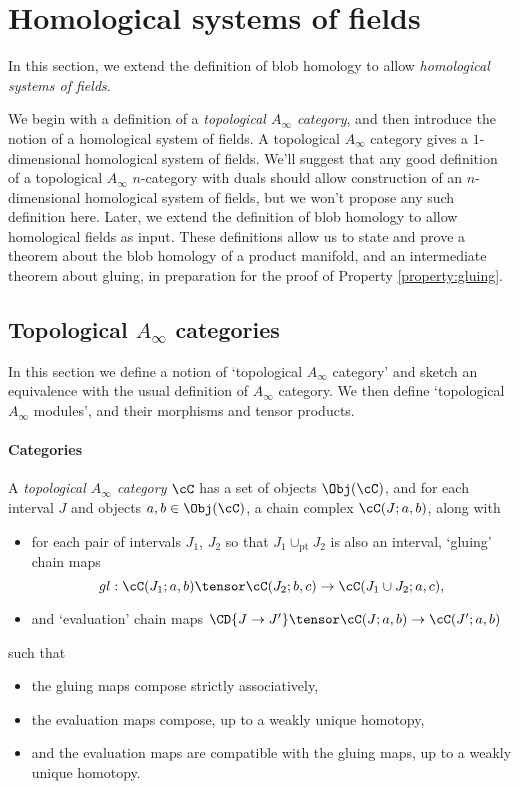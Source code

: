 
\section{Homological systems of fields}
\label{sec:homological-fields}

In this section, we extend the definition of blob homology to allow \emph{homological systems of fields}.

We begin with a definition of a \emph{topological $A_\infty$ category}, and then introduce the notion of a homological system of fields. A topological $A_\infty$ category gives a $1$-dimensional homological system of fields. We'll suggest that any good definition of a topological $A_\infty$ $n$-category with duals should allow construction of an $n$-dimensional homological system of fields, but we won't propose any such definition here. Later, we extend the definition of blob homology to allow homological fields as input. These definitions allow us to state and prove a theorem about the blob homology of a product manifold, and an intermediate theorem about gluing, in preparation for the proof of Property \ref{property:gluing}.

\subsection{Topological $A_\infty$ categories}
In this section we define a notion of `topological $A_\infty$ category' and sketch an equivalence with the usual definition of $A_\infty$ category. We then define `topological $A_\infty$ modules', and their morphisms and tensor products.

\paragraph{Categories}
\begin{defn}
\label{defn:topological-Ainfty-category}%
A \emph{topological $A_\infty$ category} $\cC$ has a set of objects $\Obj(\cC)$, and for each interval $J$ and objects $a,b \in \Obj(\cC)$, a chain complex $\cC(J;a,b)$, along with
\begin{itemize}
\item for each pair of intervals $J_1$, $J_2$ so that $J_1 \cup_{\text{pt}} J_2$ is also an interval, `gluing' chain maps
$$gl: \cC(J_1;a,b) \tensor \cC(J_2;b,c) \to \cC(J_1 \cup J_2;a,c),$$
\item and `evaluation' chain maps $\CD{J \to J'} \tensor \cC(J;a,b) \to \cC(J';a,b)$
\end{itemize}
such that 
\begin{itemize}
\item the gluing maps compose strictly associatively,
\item the evaluation maps compose, up to a weakly unique homotopy,
\item and the evaluation maps are compatible with the gluing maps, up to a weakly unique homotopy.
\end{itemize}
\end{defn}

